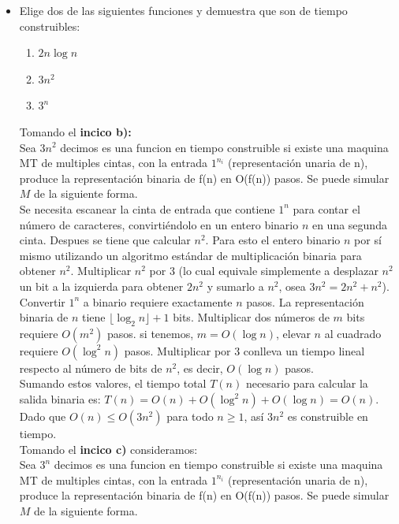 \begin{itemize}
    \item Elige dos de las siguientes funciones y demuestra que son de tiempo construibles:
    \begin{enumerate}[label=\alph*.]
        \item $2n \log n$
        \item $3n^2$
        \item $3^n$
    \end{enumerate}

    
Tomando el \textbf{incico b):}\\


Sea $3n^2$ decimos es una funcion en tiempo construible si existe una maquina MT de multiples cintas, con la entrada \(1^{n_i}\) (representación unaria de n), produce la representación binaria de f(n) en O(f(n)) pasos. Se puede simular $M$ de la siguiente forma.\\

Se necesita escanear la cinta de entrada que contiene \(1^{n}\) para contar el número de caracteres, convirtiéndolo en un entero binario \(n\) en una segunda cinta. Despues se tiene que calcular \(n^{2}\). Para esto el entero binario \(n\) por sí mismo utilizando un algoritmo estándar de multiplicación binaria para obtener \(n^{2}\). Multiplicar \(n^{2}\) por 3 (lo cual equivale simplemente a desplazar \(n^{2}\) un bit a la izquierda para obtener \(2n^{2}\) y sumarlo a \(n^{2}\), osea $3n^2 = 2n^2 + n^2$). \\

Convertir \(1^{n}\) a binario requiere exactamente \(n\) pasos. La representación binaria de \(n\) tiene \(\lfloor\log_2 n\rfloor + 1\) bits. Multiplicar dos números de \(m\) bits requiere \(O(m^2)\) pasos. si tenemos, \(m = O(\log n)\), elevar \(n\) al cuadrado requiere \(O(\log^2 n)\) pasos. Multiplicar por 3 conlleva un tiempo lineal respecto al número de bits de \(n^{2}\), es decir, \(O(\log n)\) pasos.\\

Sumando estos valores, el tiempo total \(T(n)\) necesario para calcular la salida binaria es: \(T(n)=O(n)+O(\log ^{2}n)+O(\log n)=O(n)\). Dado que \(O(n) \le O(3n^2)\) para todo \(n \ge 1\), así \(3n^{2}\) es construible en tiempo.\\

 Tomando el \textbf{incico c)} consideramos:\\

Sea $3^n$ decimos es una funcion en tiempo construible si existe una maquina MT de multiples cintas, con la entrada \(1^{n_i}\) (representación unaria de n), produce la representación binaria de f(n) en O(f(n)) pasos. Se puede simular $M$ de la siguiente forma.\\


\end{itemize}
